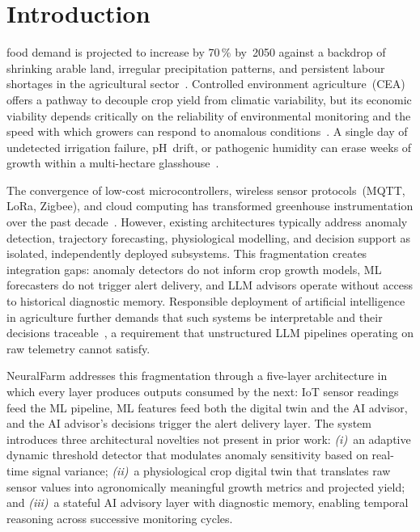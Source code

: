 \documentclass[journal,10pt,twocolumn]{IEEEtran}
\begin{document}
\section{Introduction}
\label{sec:intro}

 food demand is projected to increase by
70\,\% by~2050 against a backdrop of shrinking arable land, irregular
precipitation patterns, and persistent labour shortages in the
agricultural sector~\cite{FAO2017}.
Controlled environment agriculture~(CEA) offers a pathway to decouple
crop yield from climatic variability, but its economic viability
depends critically on the reliability of environmental monitoring and
the speed with which growers can respond to anomalous
conditions~\cite{Graamans2018}.
A single day of undetected irrigation failure, pH~drift, or pathogenic
humidity can erase weeks of growth within a multi-hectare
glasshouse~\cite{Gomez2019}.

The convergence of low-cost microcontrollers, wireless sensor
protocols~(MQTT, LoRa, Zigbee), and cloud computing has transformed
greenhouse instrumentation over the past decade~\cite{Verdouw2019}.
However, existing architectures typically address anomaly detection,
trajectory forecasting, physiological modelling, and decision support
as isolated, independently deployed subsystems.
This fragmentation creates integration gaps: anomaly detectors do not
inform crop growth models, ML forecasters do not trigger alert
delivery, and LLM advisors operate without access to historical
diagnostic memory. Responsible deployment of artificial intelligence
in agriculture further demands that such systems be interpretable and
their decisions traceable~\cite{Tzachor2023}, a requirement that
unstructured LLM pipelines operating on raw telemetry cannot satisfy.

NeuralFarm addresses this fragmentation through a five-layer
architecture in which every layer produces outputs consumed by the
next: IoT sensor readings feed the ML pipeline, ML features feed both
the digital twin and the AI advisor, and the AI advisor's decisions
trigger the alert delivery layer. The system introduces three
architectural novelties not present in prior work:
\textit{(i)}~an adaptive dynamic threshold detector that modulates
anomaly sensitivity based on real-time signal variance;
\textit{(ii)}~a physiological crop digital twin that translates
raw sensor values into agronomically meaningful growth metrics and
projected yield; and
\textit{(iii)}~a stateful AI advisory layer with diagnostic memory,
enabling temporal reasoning across successive monitoring cycles.
\end{document}
